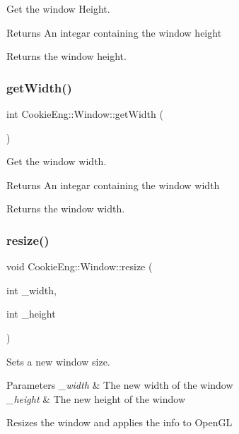 Get the window Height. 

\begin{DoxyReturn}{Returns}
An integar containing the window height
\end{DoxyReturn}
Returns the window height. \mbox{\label{class_cookie_eng_1_1_window_a41425d62b39dea360e3618425cbb12f0}} 
\subsubsection{\texorpdfstring{get\+Width()}{getWidth()}}
{\footnotesize\ttfamily int Cookie\+Eng\+::\+Window\+::get\+Width (\begin{DoxyParamCaption}{ }\end{DoxyParamCaption})\hspace{0.3cm}{\ttfamily [inline]}}



Get the window width. 

\begin{DoxyReturn}{Returns}
An integar containing the window width
\end{DoxyReturn}
Returns the window width. \mbox{\label{class_cookie_eng_1_1_window_a6fccbbff3e4efa69e6b94a57f7f99b31}} 
\subsubsection{\texorpdfstring{resize()}{resize()}}
{\footnotesize\ttfamily void Cookie\+Eng\+::\+Window\+::resize (\begin{DoxyParamCaption}\item[{int}]{\+\_\+width,  }\item[{int}]{\+\_\+height }\end{DoxyParamCaption})}



Sets a new window size. 


\begin{DoxyParams}{Parameters}
{\em \+\_\+width} & The new width of the window \\
\hline
{\em \+\_\+height} & The new height of the window\\
\hline
\end{DoxyParams}
Resizes the window and applies the info to Open\+GL \mbox{\label{class_cookie_eng_1_1_window_aebe5875df57a0ab57f3cc9da256dd439}} 

